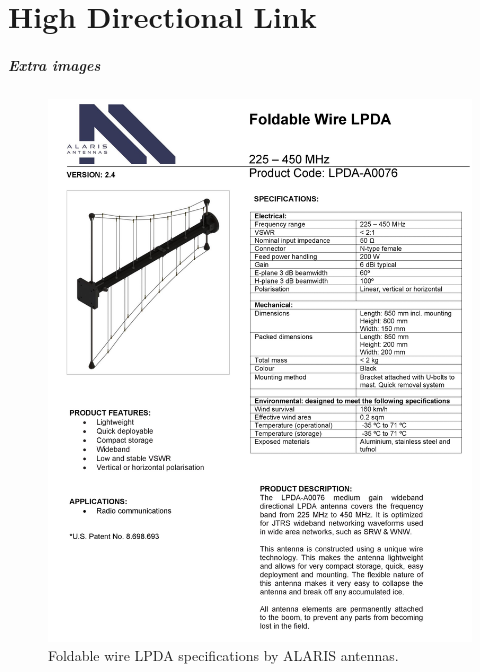 \chapter{High Directional Link}

\paragraph{Extra images}
\begin{figure}[htb]
    \centering
    \includegraphics[width=1\textwidth]{figures/Yannis/LPDA.jpg}
    \caption{Foldable wire LPDA specifications by ALARIS antennas.}
    \label{LPDA1}
\end{figure}

